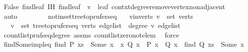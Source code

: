 \begin{isabellebody}
\ False\ find{\isacharunderscore}{\kern0pt}leaf\ IH\ find{\isacharunderscore}{\kern0pt}leaf\ \ {\isacartoucheopen}v\ {\isasymnoteq}\ leaf{\isacartoucheclose}\ contxt{\isachardot}{\kern0pt}degree{\isacharunderscore}{\kern0pt}remove{\isacharunderscore}{\kern0pt}vertex{\isacharunderscore}{\kern0pt}non{\isacharunderscore}{\kern0pt}adjacent\ \isamarkupfalse%
\ auto\isanewline
\ \ \ \ \isamarkupfalse%
\isanewline
\ \ \isamarkupfalse%
\isanewline
{}\isamarkupfalse%
%
\endisatagproof
{\isafoldproof}%
%
\isadelimproof
\isanewline
%
\endisadelimproof
\isanewline
{}\isamarkupfalse%
\ notin{\isacharunderscore}{\kern0pt}set{\isacharunderscore}{\kern0pt}tree{\isacharunderscore}{\kern0pt}to{\isacharunderscore}{\kern0pt}prufer{\isacharunderscore}{\kern0pt}seq{\isacharcolon}{\kern0pt}\isanewline
\ \ \ v{\isacharunderscore}{\kern0pt}in{\isacharunderscore}{\kern0pt}verts{\isacharcolon}{\kern0pt}\ {\isachardoublequoteopen}v\ {\isasymin}\ set\ verts{\isachardoublequoteclose}\isanewline
\ \ \ {\isachardoublequoteopen}v\ {\isasymnotin}\ set\ {\isacharparenleft}{\kern0pt}tree{\isacharunderscore}{\kern0pt}to{\isacharunderscore}{\kern0pt}prufer{\isacharunderscore}{\kern0pt}seq\ verts\ edge{\isacharunderscore}{\kern0pt}list{\isacharparenright}{\kern0pt}\ {\isasymlongleftrightarrow}\ degree\ v\ edge{\isacharunderscore}{\kern0pt}list\ {\isacharequal}{\kern0pt}\ {}{\isachardoublequoteclose}\isanewline
%
\isadelimproof
\ \ %
\endisadelimproof
%
\isatagproof
{}\isamarkupfalse%
\ count{\isacharunderscore}{\kern0pt}list{\isacharunderscore}{\kern0pt}pruf{\isacharunderscore}{\kern0pt}seq{\isacharunderscore}{\kern0pt}degree\ assms\ count{\isacharunderscore}{\kern0pt}list{\isacharunderscore}{\kern0pt}zero{\isacharunderscore}{\kern0pt}not{\isacharunderscore}{\kern0pt}elem\ \isamarkupfalse%
\ force%
\endisatagproof
{\isafoldproof}%
%
\isadelimproof
\isanewline
%
\endisadelimproof
\isanewline
{}\isamarkupfalse%
\ find{\isacharunderscore}{\kern0pt}Some{\isacharunderscore}{\kern0pt}impl{\isacharunderscore}{\kern0pt}eq{\isacharcolon}{\kern0pt}\ {\isachardoublequoteopen}find\ P\ xs\ {\isacharequal}{\kern0pt}\ Some\ x\ {\isasymLongrightarrow}\ {\isasymforall}x{\isachardot}{\kern0pt}\ Q\ x\ {\isasymlongrightarrow}\ P\ x\ {\isasymLongrightarrow}\ Q\ x\ {\isasymLongrightarrow}\ find\ Q\ xs\ {\isacharequal}{\kern0pt}\ Some\ x{\isachardoublequoteclose}\isanewline
%
\isadelimproof
\ \ %
\endisadelimproof
%
\isatagproof
{}\isamarkupfalse%

\end{isabellebody}
